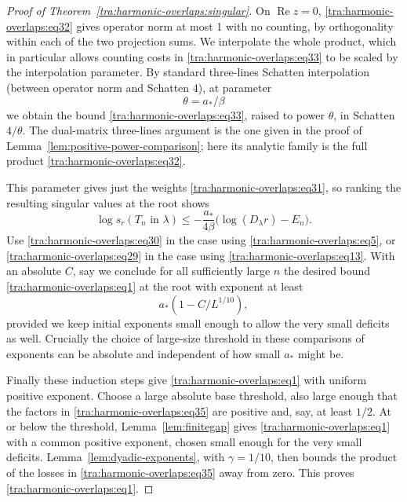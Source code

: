 \begin{proof}[Proof of Theorem~\ref{tra:harmonic-overlaps:singular}]
\label{tra:harmonic-overlaps:schatten-interpolation-and-uniform-exponent}
On \(\operatorname{Re} z=0\), \eqref{tra:harmonic-overlaps:eq32} gives operator norm at most 1 with no counting, by orthogonality within each of the two projection sums. We interpolate the whole product, which in particular allows counting costs in \eqref{tra:harmonic-overlaps:eq33} to be scaled by the interpolation parameter. By standard three-lines Schatten interpolation (between operator norm and Schatten 4), at parameter
\[
                                   \theta=a_*/\beta
\]
we obtain the bound \eqref{tra:harmonic-overlaps:eq33}, raised to power \(\theta\), in Schatten \(4/\theta\). The dual-matrix three-lines argument is the one given in the proof
of Lemma~\ref{lem:positive-power-comparison}; here its analytic
family is the full product \eqref{tra:harmonic-overlaps:eq32}.


This parameter gives just the weights \eqref{tra:harmonic-overlaps:eq31}, so ranking the resulting singular values at the root shows
\begin{equation}
                \log s_r(T_n\text{ in }\lambda)
                     \le -\frac{a_*}{4\beta}
                                         \big(\log(D_\lambda r)-E_n\big).    \label{tra:harmonic-overlaps:eq34}
\end{equation}
Use \eqref{tra:harmonic-overlaps:eq30} in the case using \eqref{tra:harmonic-overlaps:eq5}, or \eqref{tra:harmonic-overlaps:eq29} in the case using \eqref{tra:harmonic-overlaps:eq13}. With an absolute \(C\), say we conclude for all sufficiently large \(n\) the desired bound \eqref{tra:harmonic-overlaps:eq1} at the root with exponent at least
\begin{equation}
                                   a_*(1-C/L^{1/10}),                      \label{tra:harmonic-overlaps:eq35}
\end{equation}
provided we keep initial exponents small enough to allow the very small deficits as well. Crucially the choice of large-size threshold in these comparisons of exponents can be absolute and independent of how small \(a_*\) might be.

Finally these induction steps give \eqref{tra:harmonic-overlaps:eq1} with uniform positive exponent. Choose a large absolute base threshold, also large enough that the factors in \eqref{tra:harmonic-overlaps:eq35} are positive and, say, at least \(1/2\). At or below the threshold, Lemma~\ref{lem:finitegap} gives
\eqref{tra:harmonic-overlaps:eq1} with a common positive exponent,
chosen small enough for the very small deficits.
Lemma~\ref{lem:dyadic-exponents}, with $\gamma=1/10$, then bounds
the product of the losses in \eqref{tra:harmonic-overlaps:eq35}
away from zero. This proves \eqref{tra:harmonic-overlaps:eq1}.


\end{proof}

